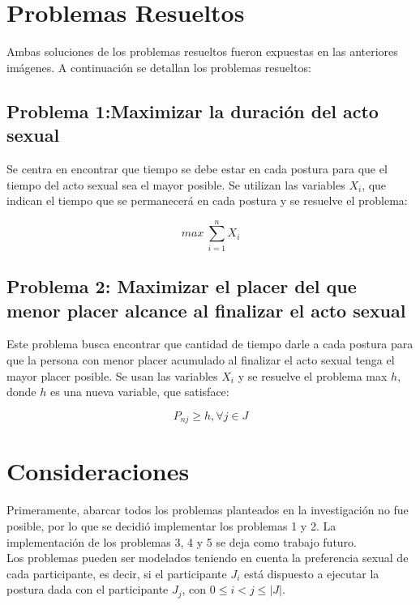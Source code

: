 \documentclass[12pt]{article}
\begin{document}
\newpage

\section{Problemas Resueltos}
Ambas soluciones de los problemas resueltos fueron expuestas en las anteriores imágenes. A continuación se detallan los problemas resueltos:

\subsection{Problema 1:Maximizar la duración del acto sexual}

Se centra en encontrar que tiempo se debe estar en cada postura para que el tiempo del acto sexual sea el mayor posible. Se utilizan las variables $X_i$, que indican el tiempo que se permanecerá en cada postura y se resuelve el problema:

$$max\ \sum^{n}_{i=1}X_i$$

\subsection{Problema 2: Maximizar el placer del que menor placer alcance al finalizar el acto sexual}

Este problema busca encontrar que cantidad de tiempo darle a cada postura para que la persona con menor placer acumulado al finalizar el acto sexual tenga el mayor placer posible. Se usan las variables $X_i$ y se resuelve el problema max $h$, donde $h$ es una nueva variable, que satisface:

$$P_{nj} \geq h, \forall j \in J$$



\section{Consideraciones}

Primeramente, abarcar todos los problemas planteados en la investigación no fue posible, por lo que se decidió implementar los problemas 1 y 2. La implementación de los problemas 3, 4 y 5 se deja como trabajo futuro.
\\
Los problemas pueden ser modelados teniendo en cuenta la preferencia sexual de cada participante, es decir, si el participante $J_i$ está dispuesto a ejecutar la postura dada con el participante $J_j$, con $0 \leq i <j \leq |J|$. 
\end{document}
